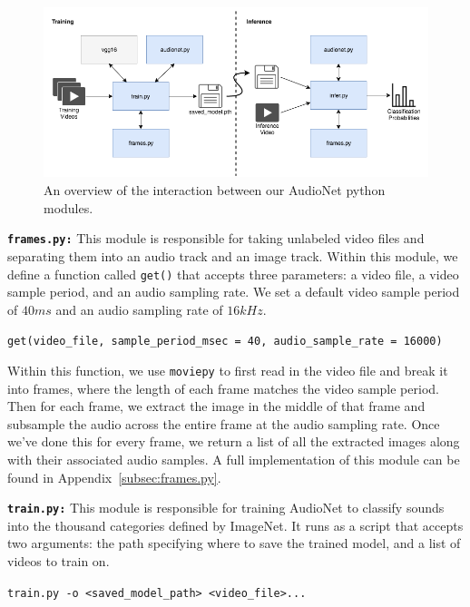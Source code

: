 \documentclass[12pt,twoside]{article}
\theoremstyle{plain}
\theoremstyle{definition}
\theoremstyle{remark}
\begin{document}
\begin{figure}[H]
   \centerline{\includegraphics[width=\textwidth]{module_diagram.png}}
   {\caption{\footnotesize An overview of the interaction between our AudioNet python modules.}
     \label{fig:module_diagram}}
\end{figure}

\bigskip
\noindent
\textbf{\texttt{frames.py:}}
This module is responsible for taking unlabeled video files and separating them into an audio track and an image track.
Within this module, we define a function called \texttt{get()} that accepts three parameters:
a video file, a video sample period, and an audio sampling rate.
We set a default video sample period of $40ms$ and an audio sampling rate of $16kHz$.

\noindent
\begin{center}
\texttt{get(video\_file, sample\_period\_msec = 40, audio\_sample\_rate = 16000)}
\end{center}

\noindent
Within this function, we use \texttt{moviepy} to first read in the video file and break it into frames, where the length of each frame matches the video sample period.
Then for each frame, we extract the image in the middle of that frame and subsample the audio across the entire frame at the audio sampling rate.
Once we’ve done this for every frame, we return a list of all the extracted images along with their associated audio samples.
A full implementation of this module can be found in Appendix~\ref{subsec:frames.py}.

\bigskip
\noindent
\textbf{\texttt{train.py:}}
This module is responsible for training AudioNet to classify sounds into the thousand categories defined by ImageNet.
It runs as a script that accepts two arguments:
the path specifying where to save the trained model, and a list of videos to train on.

\noindent
\begin{center}
\texttt{train.py -o <saved\_model\_path> <video\_file>...}
\end{center}
\end{document}
